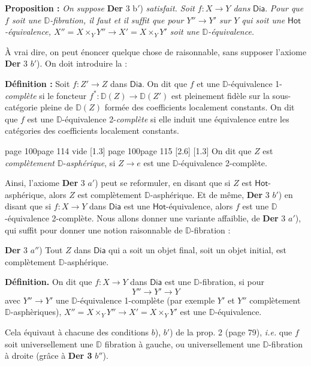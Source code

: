 \documentclass[11pt,leqno]{article}
\newcommand{\printedpage}[1]{\marginnote{\scriptsize\sffamily ed.\ #1}}
\newcommand{\msp}[1]{%
  \begingroup\def\thismsp{#1}\def\blankmsp{page 114 vide}%
  \ifx\thismsp\blankmsp
    \marginnote{\scriptsize\sffamily [114: vide]}[1.3\baselineskip]%
  \else\def\followingmsp{page 115}%
    \ifx\thismsp\followingmsp
      \marginnote{\scriptsize\sffamily [page 115]}[2.6\baselineskip]%
    \else\marginnote{\scriptsize\sffamily [#1]}[1.3\baselineskip]\fi
  \fi\endgroup}
\newcommand{\DD}{\ensuremath{\mathbb{D}}}
\newcommand{\Dia}{\ensuremath{\mathsf{Dia}}}
\newcommand{\Hot}{\ensuremath{\mathsf{Hot}}}
\begin{document}
\textbf{Proposition :} \textit{On suppose} \textbf{Der} 3 \textup{b}$'$) \textit{satisfait. Soit $f : X \to Y$ dans} \Dia. \textit{Pour que $f$ soit une $\DD$-fibration, il faut et il suffit que pour $Y'' \to Y'$ sur $Y$ qui soit une} \Hot\textit{-équivalence, $X'' = X \times_Y Y'' \to X' = X \times_Y Y'$ soit une $\DD$-équivalence.}

À vrai dire, on peut énoncer quelque chose de raisonnable, sans supposer l’axiome \textbf{Der} 3 $b'$). On doit introduire la :

\textbf{Définition :} Soit $f : Z' \to Z$ dans \Dia. On dit que $f$ et une $\DD$-équivalence 1-\textit{complète} si le foncteur $f^* : \DD(Z) \to \DD(Z')$ est pleinement fidèle sur la sous-catégorie pleine de $\DD(Z)$ formée des coefficients localement constants. On dit que $f$ est une $\DD$-équivalence 2-\textit{complète} si elle induit une équivalence entre les catégories des coefficients localement constants. %

\msp{page 100}
On dit que $Z$ est \textit{complètement} $\DD$-\textit{asphérique}, si $Z \to e$ est une $\DD$-équivalence 2-complète.

\printedpage{61}

Ainsi, l’axiome \textbf{Der} 3 $a'$) peut se reformuler, en disant que si $Z$ est \Hot-asphérique, alors $Z$ est complètement $\DD$-asphérique. Et de même, \textbf{Der} 3 $b'$) en disant que si $f : X \to Y$ dans \Dia{} est une \Hot-équivalence, alors $f$ est une $\DD$-équivalence 2-complète. Nous allons donner une variante affaiblie, de \textbf{Der} 3 $a'$), qui suffit pour donner une notion raisonnable de $\DD$-fibration :

\textbf{Der} 3 $a''$) Tout $Z$ dans \Dia{} qui a soit un objet final, soit un objet initial, est complètement $\DD$-asphérique.

\textbf{Définition.} On dit que $f : X \to Y$ dans \Dia{} est une $\DD$-fibration, si pour
\[
Y'' \longrightarrow Y' \longrightarrow Y
\]
avec $Y'' \to Y'$ une $\DD$-équivalence 1-complète (par exemple $Y'$ et $Y''$ complètement $\DD$-asphèriques), $X'' = X \times_Y Y'' \longrightarrow X' = X \times_Y Y'$ est une $\DD$-équivalence. %

Cela équivaut à chacune des conditions $b$), $b'$) de la prop. 2 (page 79), \textit{i.e.} que $f$ soit universellement une $\DD$ fibration à gauche, ou universellement une $\DD$-fibration à droite (grâce à \textbf{Der 3} $b''$). %
\end{document}

